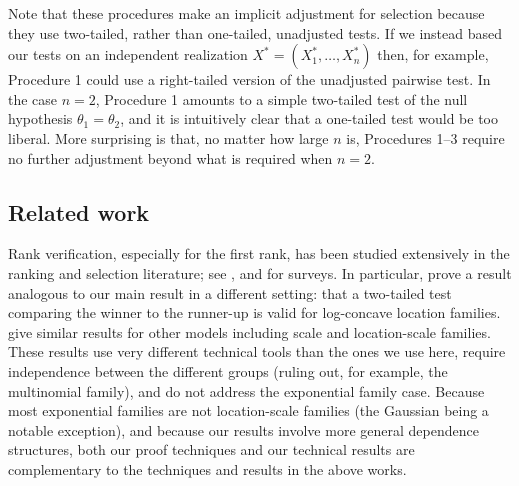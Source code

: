 \documentclass[11pt]{article}
\theoremstyle{definition}
\theoremstyle{custom}
\begin{document}
Note that these procedures make an implicit adjustment for selection because they use two-tailed, rather than one-tailed, unadjusted tests. If we instead based our tests on an independent realization $X^* = (X_1^*, \ldots, X_n^*)$ then, for example, Procedure 1 could use a right-tailed version of the unadjusted pairwise test. In the case $n = 2$, Procedure 1 amounts to a simple two-tailed test of the null hypothesis $\theta_1 = \theta_2$, and it is intuitively clear that a one-tailed test would be too liberal. More surprising is that, no matter how large $n$ is, Procedures 1--3 require no further adjustment beyond what is required when $n = 2$. 

\subsection{Related work}

Rank verification, especially for the first rank, has been studied extensively in the ranking and selection literature; see \citet{Gupta:1971wk, Gupta:1985bj}, and \citet{Hsu:1996} for surveys. In particular, \citet{Gutmann:1987fk} prove a result analogous to our main result in a different setting: that a two-tailed test comparing the winner to the runner-up is valid for log-concave location families. \citet{Bofinger:1991hv, Maymin:1992fz, Karnnan:2009iv} give similar results for other models including scale and location-scale families. These results use very different technical tools than the ones we use here, require independence between the different groups (ruling out, for example, the multinomial family), and do not address the exponential family case. Because most exponential families are not location-scale families (the Gaussian being a notable exception), and because our results involve more general dependence structures, both our proof techniques and our technical results are complementary to the techniques and results in the above works.
\end{document}
